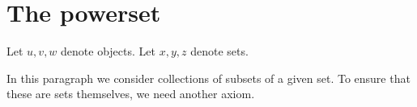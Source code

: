 \documentclass[../../set-theory.ftl.tex]{subfiles}
\begin{document}
  \begin{comment}
    \begin{forthel}

    \end{forthel}
  \end{comment}


  \section{The powerset}

  \begin{forthel}
  \end{forthel}

  \begin{forthel}
    Let $u,v,w$ denote objects.
    Let $x,y,z$ denote sets.
  \end{forthel}

  \noindent In this paragraph we consider collections of subsets of a given set.
  To ensure that these are sets themselves, we need another axiom.
\end{document}
